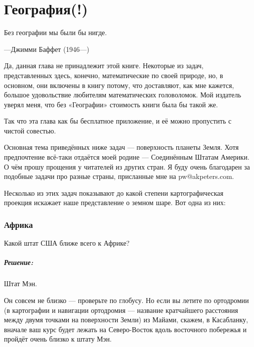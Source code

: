 \chapter*{География(!)}

\setlength{\epigraphwidth}{.45\textwidth}
\epigraph{Без географии мы были бы нигде.}{---Джимми Баффет (1946---)}%

Да, данная глава не принадлежит этой книге. %
Некоторые из задач, представленных здесь, конечно, математические по своей природе, %
но, в основном, они включены в книгу потому, что доставляют, как мне кажется, большое удовольствие любителям математических головоломок.
Мой издатель уверял меня, что без «Географии» стоимость книги была бы такой же.

Так что эта глава как бы бесплатное приложение, и её можно пропустить с чистой совестью.

Основная тема приведённых ниже задач --- поверхность планеты Земля.
Хотя предпочтение всё-таки отдаётся моей родине --- Соединённым Штатам Америки. 
О чём прошу прощения у читателей из других стран.
Я буду очень благодарен за подобные задачи про разные страны, присланные мне на pw@akpeters.com.

Несколько из этих задач показывают до какой степени %
картографическая проекция %
искажает наше представление о земном шаре. %
Вот одна из них: 

\subsection*{Африка}

Какой штат США ближе всего к Африке? 

\paragraph{Решение:} Штат Мэн.\heart
  
Он совсем не близко --- проверьте по глобусу.
Но если вы летите по ортодромии (в картографии и навигации ортодромия --- название кратчайшего расстояния между двумя точками на поверхности Земли) из Майами, скажем, в Касабланку, вначале ваш курс %
будет лежать на Северо-Восток вдоль восточного побережья и пройдёт очень близко к штату Мэн.

\medskip


